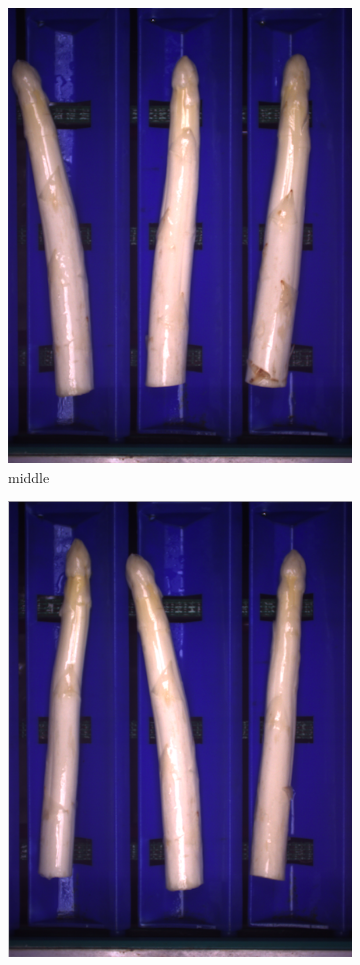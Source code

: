 \begin{figure}[!h]
\begin{subfigure}{0.3\textwidth}
		\includegraphics[width=0.95\linewidth]{Figures/chapter02/anna_b.png}
		\caption{middle}
	\end{subfigure}
	\begin{subfigure}{0.3\textwidth}
		\includegraphics[width=0.95\linewidth]{Figures/chapter02/anna_c.png}

\end{subfigure}
\end{figure}
